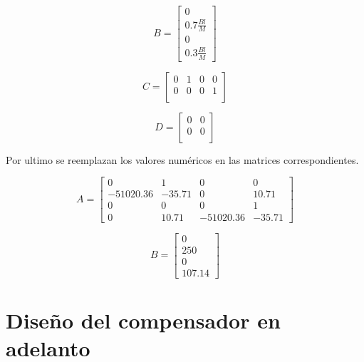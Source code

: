 \documentclass[journal]{IEEEtran}
\begin{document}
\begin{equation*}
B=\begin{bmatrix} 0  \\  0.7\frac{Bl}{M} \\ 0  \\ 0.3\frac{Bl}{M}  \end{bmatrix}
\end{equation*}

\begin{equation*}
C=\begin{bmatrix} 0 & 1 & 0 & 0 \\ 0 & 0 & 0 & 1 \\ \end{bmatrix}
\end{equation*}

\begin{equation*}
D=\begin{bmatrix} 0 & 0 \\ 0 & 0 \\ \end{bmatrix}
\end{equation*}


Por ultimo se reemplazan los valores numéricos en las matrices correspondientes.

\begin{equation*}
A=\begin{bmatrix} 0 & 1 & 0 & 0 \\ -51020.36 & -35.71& 0 & 10.71 \\ 0 & 0 & 0 & 1 \\ 0 & 10.71 & -51020.36 & -35.71 \end{bmatrix}
\end{equation*}

\begin{equation*}
B=\begin{bmatrix} 0  \\  250 \\ 0  \\ 107.14  \end{bmatrix}
\end{equation*}



\section{Diseño del compensador en adelanto}
\end{document}
